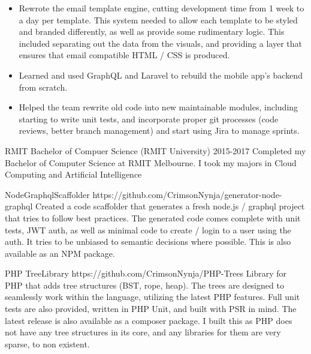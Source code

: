 \documentclass[8pt]{developercv}
\begin{document}
\begin{minipage}[t]{0.7\textwidth}
\begin{entrylist}
{\begin{itemize}
					\item Rewrote the email template engine, cutting development time from 1 week to a day per template. This system needed to allow each template to be styled and branded differently, as well as provide some rudimentary logic. This included separating out the data from the visuals, and providing a layer that ensures that email compatible HTML / CSS is produced.
					\item Learned and used GraphQL and Laravel to rebuild the mobile app's backend from scratch.
					\item Helped the team rewrite old code into new maintainable modules, including starting to write unit tests, and incorporate proper git processes (code reviews, better branch management) and start using Jira to manage sprints.
				\end{itemize}
				}
		\end{entrylist}			
		\begin{entrylist}	%
			\entry
				{RMIT}
				{Bachelor of Compuer Science (RMIT University)}
				{2015-2017}
				{Completed my Bachelor of Computer Science at RMIT Melbourne. I took my majors in Cloud Computing and Artificial Intelligence }
		\end{entrylist}
		\begin{entrylist}	%
			\entry
				{Node\newline Graphql\newline Scaffolder}
				{https://github.com/CrimsonNynja/generator-node-graphql}
				{}
				{Created a code scaffolder that generates a fresh node.js / graphql project that tries to follow best practices. The generated code comes complete with unit tests, JWT auth, as well as minimal code to create / login to a user using the auth. It tries to be unbiased to semantic decisions where possible. This is also available as an NPM package.}
		\end{entrylist}
		\begin{entrylist}	%
			\entry
				{PHP Tree\newline Library}
				{https://github.com/CrimsonNynja/PHP-Trees}
				{}
				{Library for PHP that adds tree structures (BST, rope, heap). The trees are designed to seamlessly work within the language, utilizing the latest PHP features. Full unit tests are also provided, written in PHP Unit, and built with PSR in mind. The latest release is also available as a composer package. I built this as PHP does not have any tree structures in its core, and any libraries for them are very sparse, to non existent. }
		\end{entrylist}
	\end{minipage}
\end{document}
